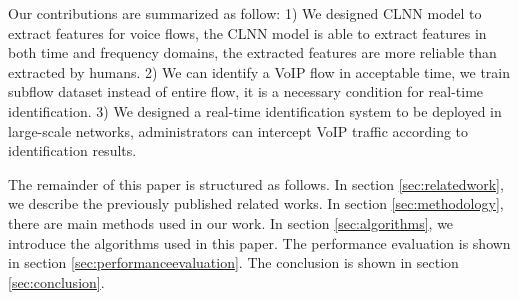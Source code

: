\documentclass[conference]{IEEEtran}
\begin{document}
Our contributions are summarized as follow: 1) We designed CLNN model to extract features for voice flows, the CLNN model is able to extract features in both time and frequency domains, the extracted features are more reliable than extracted by humans. 2) We can identify a VoIP flow in acceptable time, we train subflow dataset instead of entire flow, it is a necessary condition for real-time identification. 3) We designed a real-time identification system to be deployed in large-scale networks, administrators can intercept VoIP traffic according to identification results.

The remainder of this paper is structured as follows. In section \ref{sec:relatedwork}, we describe the previously published related works.  In section \ref{sec:methodology}, there are main methods used in our work.
In section \ref{sec:algorithms}, we introduce the algorithms used in this paper. The performance evaluation is shown in section \ref{sec:performanceevaluation}. The conclusion is shown in section \ref{sec:conclusion}.





\end{document}
